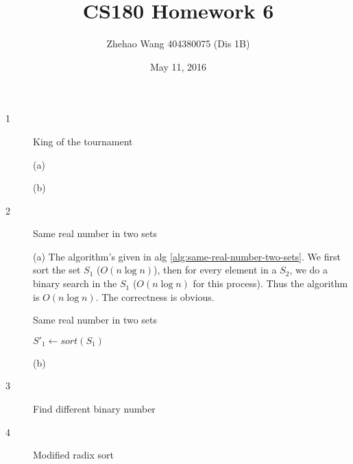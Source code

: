\documentclass{article}
\title{CS180 Homework 6}
\author{Zhehao Wang 404380075 (Dis 1B)}
\date{May 11, 2016}
\begin{document}
\maketitle

\begin{description}

\item[1]{King of the tournament}

  (a)

  (b)
  
\item[2]{Same real number in two sets}
  
  (a) The algorithm's given in alg \ref{alg:same-real-number-two-sets}. We first sort the set $S_1$ ($O(n \log n)$), then for every element in a $S_2$, we do a binary search in the $S_1$ ($O(n \log n)$ for this process). Thus the algorithm is $O(n \log n)$. The correctness is obvious.

  \begin{algorithm}[H]
  \caption{Same real number in two sets}
  \label{alg:same-real-number-two-sets}
    \begin{algorithmic}[1]
    
      \State $S'_1 \gets sort(S_1)$
          \State {}
        \EndIf
      \EndFor
      \State {}
    \EndFunction

    \end{algorithmic}
  \end{algorithm}

  (b) 

\item[3]{Find different binary number}
 


\item[4]{Modified radix sort}
  


\end{description}
\end{document}
